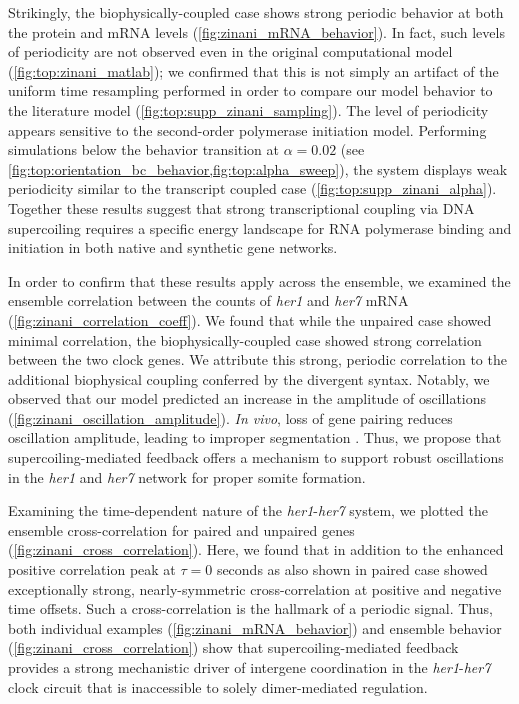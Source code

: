 \documentclass[11pt]{article}
\begin{document}
Strikingly, the biophysically-coupled case shows strong periodic behavior at both the protein and mRNA levels (\cref{fig:zinani_mRNA_behavior}). In fact, such levels of periodicity are not observed even in the original computational model (\cref{fig:top:zinani_matlab}); we confirmed that this is not simply an artifact of the uniform time resampling performed in order to compare our model behavior to the literature model (\cref{fig:top:supp_zinani_sampling}). The level of periodicity appears sensitive to the second-order polymerase initiation model. Performing simulations below the behavior transition at \(\alpha = 0.02\) (see \cref{fig:top:orientation_bc_behavior,fig:top:alpha_sweep}), the system displays weak periodicity similar to the transcript coupled case (\cref{fig:top:supp_zinani_alpha}). Together these results suggest that strong transcriptional coupling via DNA supercoiling requires a specific energy landscape for RNA polymerase binding and initiation in both native and synthetic gene networks. 

In order to confirm that these results apply across the ensemble, we examined the ensemble correlation between the counts of \textit{her1} and \textit{her7} mRNA (\cref{fig:zinani_correlation_coeff}). We found that while the unpaired case showed minimal correlation, the biophysically-coupled case showed strong correlation between the two clock genes. We attribute this strong, periodic correlation to the additional biophysical coupling conferred by the divergent syntax. Notably, we observed that our model predicted an increase in the amplitude of oscillations (\cref{fig:zinani_oscillation_amplitude}). \textit{In vivo}, loss of gene pairing reduces oscillation amplitude, leading to improper segmentation \parencite{zinaniPairingSegmentationClock2021}. Thus, we propose that supercoiling-mediated feedback offers a mechanism to support robust oscillations in the \textit{her1} and \textit{her7} network for proper somite formation. 

Examining the time-dependent nature of the \textit{her1}-\textit{her7} system, we plotted the ensemble cross-correlation for paired and unpaired genes (\cref{fig:zinani_cross_correlation}). Here, we found that in addition to the enhanced positive correlation peak at \(\tau = 0\) seconds as also shown in paired case showed exceptionally strong, nearly-symmetric cross-correlation at positive and negative time offsets. Such a cross-correlation is the hallmark of a periodic signal. Thus, both individual examples (\cref{fig:zinani_mRNA_behavior}) and ensemble behavior (\cref{fig:zinani_cross_correlation}) show that supercoiling-mediated feedback provides a strong mechanistic driver of intergene coordination in the \textit{her1}-\textit{her7} clock circuit that is inaccessible to solely dimer-mediated regulation.
\end{document}
